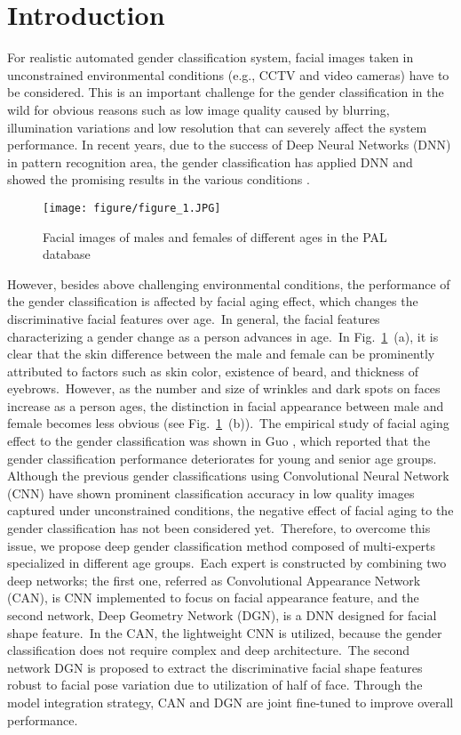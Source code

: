 \documentclass[10pt,twocolumn,letterpaper]{article}
\begin{document}
\section{Introduction}
\label{introduction}
For realistic automated gender classification system, facial images taken in unconstrained environmental conditions (e.g., CCTV and video cameras) have to be considered. This is an important challenge for the gender classification in the wild for obvious reasons such as low image quality caused by blurring, illumination variations and low resolution that can severely affect the system performance. In recent years, due to the success of Deep Neural Networks (DNN) in pattern recognition area, the gender classification has applied DNN and showed the promising results in the various conditions \cite{Antipov2016, Levi2015, Zhu2016, Han2018, Zhang2017, RODRIGUEZ2017563}.
\begin{figure}[!h]
\begin{center}
    \texttt{[image: figure/figure\_1.JPG]}
\end{center}
\caption{Facial images of males and females of different ages in the PAL database \cite{Minear2004}}
\label{fig:figure_1}
\end{figure}
However, besides above challenging environmental conditions, the performance of the gender classification is affected by facial aging effect, which changes the discriminative facial features over age.~In general, the facial features characterizing a gender change as a person advances in age.~In Fig.~\ref{fig:figure_1}~(a), it is clear that the skin difference between the male and female can be prominently attributed to factors such as skin color, existence of beard, and thickness of eyebrows.~However, as the number and size of wrinkles and dark spots on faces increase as a person ages, the distinction in facial appearance between male and female becomes less obvious (see Fig.~\ref{fig:figure_1}~(b)).~The empirical study of facial aging effect to the gender classification was shown in Guo \etal \cite{Guo2009}, which reported that the gender classification performance deteriorates for young and senior age groups. Although the previous gender classifications using Convolutional Neural Network (CNN) have shown prominent classification accuracy in low quality images captured under unconstrained conditions, the negative effect of facial aging to the gender classification has not been considered yet.~Therefore, to overcome this issue, we propose deep gender classification method composed of multi-experts specialized in different age groups.~Each expert is constructed by combining two deep networks; the first one, referred as Convolutional Appearance Network (CAN), is CNN implemented to focus on facial appearance feature, and the second network, Deep Geometry Network (DGN), is a DNN designed for facial shape feature.~In the CAN, the lightweight CNN is utilized, because the gender classification does not require complex and deep architecture.~The second network DGN is proposed to extract the discriminative facial shape features robust to facial pose variation due to utilization of half of face. Through the model integration strategy, CAN and DGN are joint fine-tuned to improve overall performance.
\end{document}
